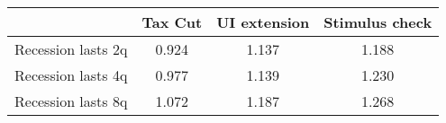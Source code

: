 \begin{tabular}{@{}lccc@{}} 
\toprule 
& Tax Cut    & UI extension    & Stimulus check    \\  \midrule 
Recession lasts 2q &0.924  & 1.137  & 1.188     \\ 
Recession lasts 4q &0.977  & 1.139  & 1.230     \\ 
Recession lasts 8q &1.072  & 1.187  & 1.268     \\ 
\end{tabular}  
